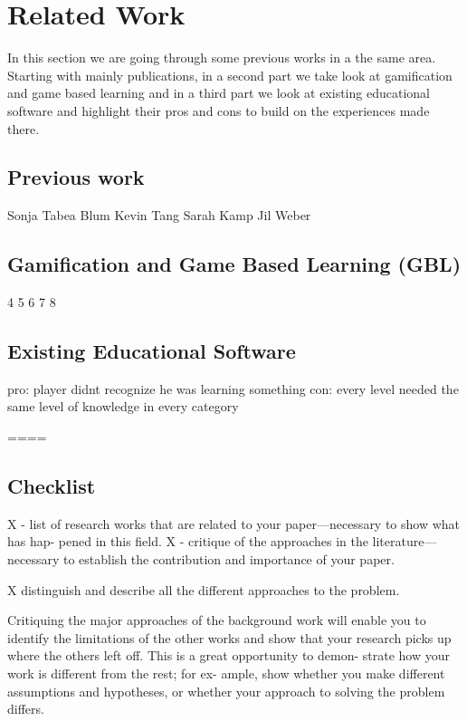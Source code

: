
\setcounter{chapter}{1}

\chapter{Related Work}
\label{chap:relatedwork}

In this section we are going through some previous works in a the same area.
Starting with mainly publications, in a second part we take look at gamification
and game based learning and in a third part we look at existing educational software
and highlight their pros and cons to build on the experiences made there.

\section{Previous work}
Sonja Tabea Blum
Kevin Tang
Sarah Kamp
Jil Weber

\section{Gamification and Game Based Learning (GBL)}
4
5
6
7
8

\section{Existing Educational Software}

pro: player didnt recognize he was learning something
con: every level needed the same level of knowledge in every category

====
\section{Checklist}
X - list of research works that are related to your paper—necessary to show what has hap-
pened in this field.
X - critique of the approaches in the literature—necessary to establish the
contribution and importance of your paper.

X distinguish and describe all the different approaches to the problem.

Critiquing the major approaches of the background
work will enable you to identify the limitations of the
other works and show that your research picks up where
the others left off. This is a great opportunity to demon-
strate how your work is different from the rest; for ex-
ample, show whether you make different assumptions
and hypotheses, or whether your approach to solving the
problem differs.

